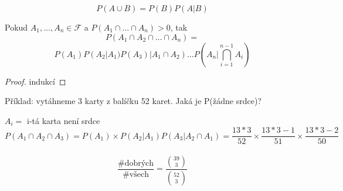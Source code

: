 \documentclass[../main.tex]{subfiles}
\begin{document}
\begin{definition}
    \[P(A\cup B) = P(B)P(A|B)\]
\end{definition}
\begin{theorem}
    Pokud $A_1,\dots,A_n \in \mathcal{F}$ a $P(A_1\cap \dots \cap A_n) > 0$, tak
    \[P(A_1\cap A_2 \cap \dots \cap A_n) = \]
    \[P(A_1)P(A_2|A_1)P(A_3)|A_1\cap A_2) \dots P(A_n | \bigcap^{n-1}_{i=1} A_i)\]
\end{theorem}
\begin{proof}
    indukcí    
\end{proof}


\begin{example}
    Příklad: vytáhneme 3 karty z balíčku 52 karet. Jaká je P(žádne srdce)?

    $A_i =$ i-tá karta není srdce\\
    \[P(A_1\cap A_2 \cap A_3) = P(A_1) \times P(A_2 | A_1) P(A_3 | A_2\cap A_1) = \frac{13*3}{52} \times \frac{13*3 -1}{51} \times \frac{13*3 - 2}{50}\]
    \\ \[\frac{\text{\#dobrých}}{\text{\#všech}} = \frac{\binom{39}{3}}{\binom{52}{3}}\]
\end{example}
\end{document}
